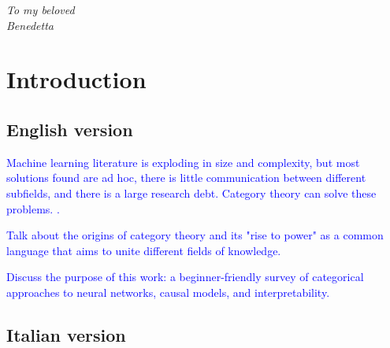 \documentclass[11pt,a4paper,openright,twoside]{report}
\theoremstyle{plain}
\theoremstyle{definition}
\begin{document}
\begin{titlepage}
\thispagestyle{empty}                   
\topmargin=6.5cm                        
\raggedleft                             
\large                                  
                                       
\em                                     
To my beloved\\
Benedetta                   
\newpage                                

\clearpage{\pagestyle{empty}\cleardoublepage}
\end{titlepage}


            





\chapter*{Introduction}   



  \section*{English version}




  \textcolor{blue}{Machine learning literature is exploding in size and complexity, but most solutions found are ad hoc, there is little communication between different subfields, and there is a large research debt. Category theory can solve these problems.  \cite{shieblerCategoryTheoryMachine2021}.}

  \textcolor{blue}{Talk about the origins of category theory and its "rise to power" as a common language that aims to unite different fields of knowledge.}
    
  \textcolor{blue}{Discuss the purpose of this work: a beginner-friendly survey of categorical approaches to neural networks, causal models, and interpretability.}


  \section*{Italian version}
\end{document}

